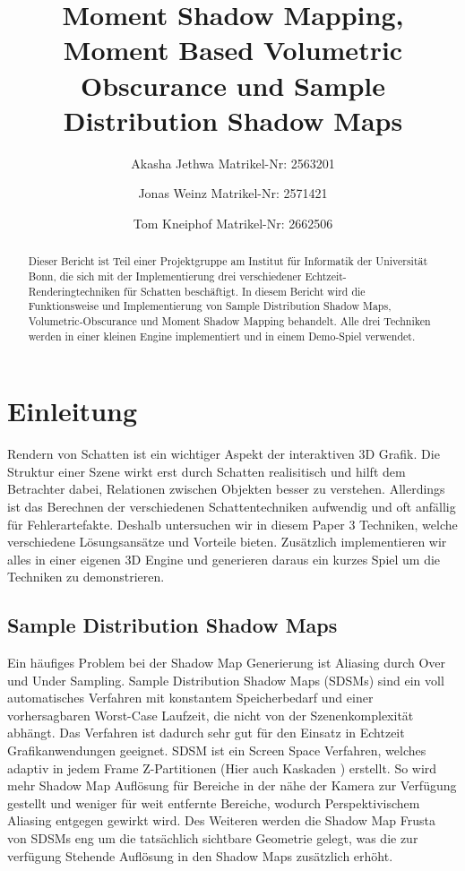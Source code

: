 \documentclass[runningheaders,a4paper]{llncs}
\title{ Moment Shadow Mapping, Moment Based Volumetric Obscurance und Sample Distribution Shadow Maps }
\author{
	Akasha Jethwa 
	Matrikel-Nr: 2563201
	\and
	Jonas Weinz 
	Matrikel-Nr: 2571421
	\and
	Tom Kneiphof 
	Matrikel-Nr: 2662506
}
\institute{Institut für Informatik der Universität Bonn}
\begin{document}
\maketitle

\begin{abstract}
Dieser Bericht ist Teil einer Projektgruppe am Institut für Informatik der Universität Bonn,
die sich mit der Implementierung drei verschiedener Echtzeit-Renderingtechniken für Schatten beschäftigt.
In diesem Bericht wird die Funktionsweise und Implementierung von Sample Distribution Shadow Maps, Volumetric-Obscurance und Moment Shadow Mapping behandelt.
Alle drei Techniken werden in einer kleinen Engine implementiert und in einem Demo-Spiel verwendet.
\end{abstract}


\section{Einleitung}
Rendern von Schatten ist ein wichtiger Aspekt der interaktiven 3D Grafik.
Die Struktur einer Szene wirkt erst durch Schatten realisitisch und hilft dem Betrachter dabei, Relationen zwischen Objekten besser zu verstehen.
Allerdings ist das Berechnen der verschiedenen Schattentechniken aufwendig und oft anfällig für Fehlerartefakte.
Deshalb untersuchen wir in diesem Paper 3 Techniken, welche verschiedene Lösungsansätze und Vorteile bieten.
Zusätzlich implementieren wir alles in einer eigenen 3D Engine und generieren daraus ein kurzes Spiel um die Techniken zu demonstrieren.


\subsection{Sample Distribution Shadow Maps}

Ein häufiges Problem bei der Shadow Map Generierung ist Aliasing durch Over und Under Sampling.
Sample Distribution Shadow Maps (SDSMs) \cite{sdsm} sind ein voll automatisches Verfahren mit konstantem Speicherbedarf und einer vorhersagbaren Worst-Case Laufzeit, die nicht von der Szenenkomplexität abhängt.
Das Verfahren ist dadurch sehr gut für den Einsatz in Echtzeit Grafikanwendungen geeignet.
SDSM ist ein Screen Space Verfahren, welches adaptiv in jedem Frame Z-Partitionen \cite{zpart} (Hier auch Kaskaden \cite{csm}) erstellt.
So wird mehr Shadow Map Auflösung für Bereiche in der nähe der Kamera zur Verfügung gestellt und weniger für weit entfernte Bereiche, wodurch Perspektivischem Aliasing entgegen gewirkt wird.
Des Weiteren werden die Shadow Map Frusta von SDSMs eng um die tatsächlich sichtbare Geometrie gelegt, was die zur verfügung Stehende Auflösung in den Shadow Maps zusätzlich erhöht.
\end{document}
